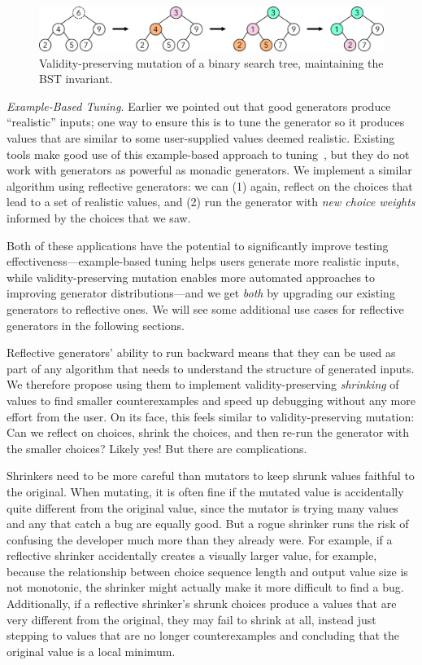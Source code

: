 \begin{figure}[h]
  \centering
  \includegraphics[width=.7\textwidth]{assets/mutate-diagram.pdf}
  \caption{Validity-preserving mutation of a binary search tree, maintaining the
  BST invariant.}\label{fig:mutation}
\end{figure}

{\em Example-Based Tuning.} Earlier we pointed out that good generators
produce ``realistic'' inputs; one way to ensure this is to tune the generator so
it produces values that are similar to some user-supplied values deemed
realistic. Existing tools make good use of this example-based approach to
tuning~\cite{soremekun2020inputs}, but they do not work with generators as
powerful as monadic generators. We implement a similar algorithm using
reflective generators: we can (1) again, reflect on the choices that lead to a
set of realistic values, and (2) run the generator with {\em new choice weights}
informed by the choices that we saw.

Both of these applications have the potential to significantly improve
testing effectiveness---example-based tuning helps users generate more
realistic inputs, while validity-preserving mutation enables more
automated approaches to improving generator distributions---and we get
{\em both} by upgrading our existing generators to reflective ones. We
will see some additional use cases for reflective generators in the
following sections.

%
Reflective generators' ability to run backward means that they can be used as
part of any algorithm that needs to understand the structure of generated
inputs.  We therefore propose using them to implement validity-preserving {\em
shrinking} of values to find smaller counterexamples and speed up debugging
without any more effort from the user. On its face, this feels similar to
validity-preserving mutation: Can we reflect on choices, shrink the choices, and
then re-run the generator with the smaller choices? Likely yes! But there are
complications.

Shrinkers need to be more careful than mutators to keep shrunk values faithful
to the original. When mutating, it is often fine if the mutated value is
accidentally quite different from the original value, since the mutator is
trying many values and any that catch a bug are equally good. But a rogue
shrinker runs the risk of confusing the developer much more than they already
were. For example, if a reflective shrinker accidentally creates a visually larger
value, for example, because the relationship between choice sequence length and
output value size is not monotonic, the shrinker might actually make it more
difficult to find a bug. Additionally, if a reflective shrinker's shrunk choices
produce a values that are very different from the original, they may fail to
shrink at all, instead just stepping to values that are no longer
counterexamples and concluding that the original value is a local minimum.


